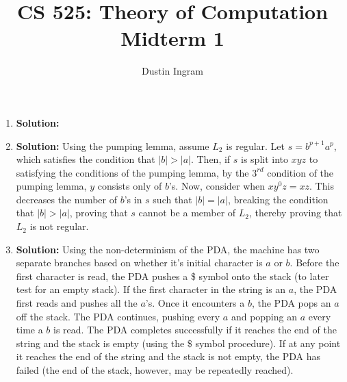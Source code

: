 \documentclass{article}
\title{CS 525: Theory of Computation\\ Midterm 1}
\author{Dustin Ingram}
\begin{document}
\maketitle
\begin{enumerate}
    \item \textbf{Solution:}
    \begin{figure}[!h]
    \centering
    \end{figure}

    \item \textbf{Solution:}
    Using the pumping lemma, assume $L_{2}$ is regular. Let $s=b^{p+1}a^{p}$, which satisfies the condition that $|b|>|a|$. Then, if $s$ is split into $xyz$ to satisfying the conditions of the pumping lemma, by the $3^{rd}$ condition of the pumping lemma, $y$ consists only of $b$'s. Now, consider when $xy^{0}z = xz$. This decreases the number of $b$'s in $s$ such that $|b|=|a|$, breaking the condition that $|b|>|a|$, proving that $s$ cannot be a member of $L_{2}$, thereby proving that $L_{2}$ is not regular.

    \item \textbf{Solution:}
    Using the non-determinism of the PDA, the machine has two separate branches based on whether it's initial character is $a$ or $b$. Before the first character is read, the PDA pushes a \$ symbol onto the stack (to later test for an empty stack). If the first character in the string is an $a$, the PDA first reads and pushes all the $a$'s. Once it encounters a $b$, the PDA pops an $a$ off the stack. The PDA continues, pushing every $a$ and popping an $a$ every time a $b$ is read. The PDA completes successfully if it reaches the end of the string and the stack is empty (using the \$ symbol procedure). If at any point it reaches the end of the string and the stack is not empty, the PDA has failed (the end of the stack, however, may be repeatedly reached).


\end{enumerate}
\end{document}
